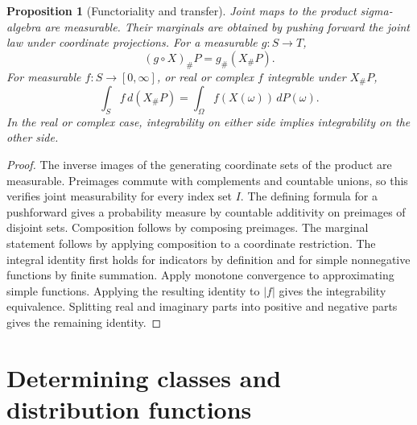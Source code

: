 \documentclass[11pt,oneside,openany]{book}
\theoremstyle{plain}
\newtheorem{proposition}[theorem]{Proposition}
\theoremstyle{definition}
\theoremstyle{remark}
\begin{document}
\begin{proposition}[Functoriality and transfer]
\label{thm:prob-transfer}
Joint maps to the product sigma-algebra are measurable. Their marginals
are obtained by pushing forward the joint law under coordinate
projections. For a measurable \(g\colon S\to T\),
\[
 (g\circ X)_\#P=g_\#(X_\#P).
\]
For measurable \(f\colon S\to[0,\infty]\), or real or complex \(f\)
integrable under \(X_\#P\),
\[
 \int_S f\,d(X_\#P)=\int_\Omega f(X(\omega))\,dP(\omega).
\]
In the real or complex case, integrability on either side implies
integrability on the other side.
\end{proposition}
\begin{proof}
The inverse images of the generating coordinate sets of the product are
measurable. Preimages commute with complements and countable unions, so
this verifies joint measurability for every index set \(I\). The defining
formula for a pushforward gives a probability measure by countable
additivity on preimages of disjoint sets. Composition follows by
composing preimages. The marginal statement follows by applying
composition to a coordinate restriction. The integral identity first
holds for indicators by definition and for simple nonnegative functions
by finite summation. Apply monotone convergence to approximating simple
functions. Applying the resulting identity to \(\lvert f\rvert\) gives
the integrability equivalence. Splitting real and imaginary parts into
positive and negative parts gives the remaining identity.
\end{proof}

\section{Determining classes and distribution functions}
\label{p01-03}
\end{document}
